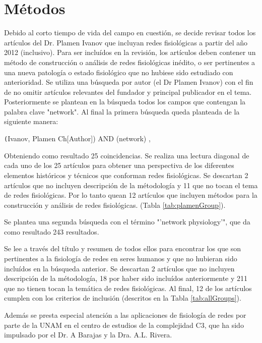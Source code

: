 \documentclass[twoside,twocolumn]{article}
\begin{document}
\section{Métodos}
Debido al corto tiempo de vida del campo en cuestión, se decide revisar todos los artículos del Dr. Plamen Ivanov que incluyan redes fisiológicas a partir del año 2012 (inclusivo).
Para ser incluídos en la revisión, los artículos deben contener un método de construcción o análisis de redes fisiológicas inédito, o ser pertinentes a una nueva patología o estado fisiológico que no hubiese sido estudiado con anterioridad.
Se utiliza una búsqueda por autor (el Dr Plamen Ivanov) con el fin de no omitir artículos relevantes del fundador y principal publicador en el tema. Posteriormente se plantean en la búsqueda todos los campos que contengan la palabra clave "network". Al final la primera búsqueda queda planteada de la siguiente manera:

\texttt(Ivanov, Plamen Ch[Author]) AND (network) ,

Obteniendo como resultado 25 coincidencias. Se realiza una lectura diagonal de cada uno de los 25 artículos para obtener una perspectiva de los diferentes elementos históricos y técnicos que conforman redes fisiológicas.
Se descartan 2 artículos que no incluyen descripción de la métodología y 11 que no tocan el tema de redes fisiológicas. Por lo tanto quean 12 artículos que incluyen métodos para la construcción y análisis de redes fisiológicas. (Tabla \ref{tab:plamenGroup}).

Se plantea una segunda búsqueda con el término "'network physiology'", que da como resultado 243 resultados.

Se lee a través del título y resumen de todos ellos para  encontrar los que son pertinentes a la fisiología de redes en seres humanos y que no hubieran sido incluídos en la búsqueda anterior.
Se descartan 2 artículos que no incluyen descripción de la métodología, 18 por haber sido incluídos anteriormente y 211 que no tienen tocan la temática de redes fisiológicas.
Al final, 12 de los artículos cumplen con los criterios de inclusión (descritos en la Tabla \ref{tab:allGroups}).

Además se presta especial atención a las aplicaciones de fisiología de redes por parte de la UNAM en el centro de estudios de la complejidad C3, que ha sido impulsado por el Dr. A Barajas y la Dra. A.L. Rivera.
\end{document}
